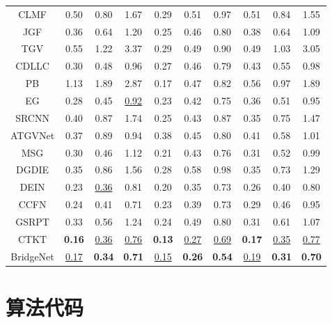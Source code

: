 \documentclass{bjtu-bachelor-thesis}
\begin{document}
{\begin{longtable}{c|ccc|ccc|ccc}
CLMF      & 0.50 & 0.80       & 1.67          & 0.29 & 0.51 & 0.97 & 0.51 & 0.84 & 1.55          \\ 
JGF     & 0.36 & 0.64       & 1.20          & 0.25 & 0.46 & 0.80 & 0.38 & 0.64 & 1.09          \\ 
TGV       & 0.55 & 1.22       & 3.37          & 0.29 & 0.49 & 0.90 & 0.49 & 1.03 & 3.05          \\ 
CDLLC    & 0.30 & 0.48       & 0.96          & 0.27 & 0.46 & 0.79 & 0.43 & 0.55 & 0.98          \\ 
PB       & 1.13 & 1.89       & 2.87          & 0.17 & 0.47 & 0.82 & 0.56 & 0.97 & 1.89          \\ \bottomrule[1.5pt]
EG       & 0.28 & 0.45       & \uline{0.92}    & 0.23 & 0.42 & 0.75 & 0.36 & 0.51 & 0.95          \\ 
\hline
SRCNN   & 0.40 & 0.87       & 1.74          & 0.25 & 0.43 & 0.87 & 0.35 & 0.75 & 1.47          \\
ATGVNet  & 0.37 & 0.89       & 0.94          & 0.38 & 0.45 & 0.80 & 0.41 & 0.58 & 1.01 \\
MSG    & 0.30 & 0.46       & 1.12          & 0.21 & 0.43 & 0.76 & 0.31 & 0.52 & 0.99          \\
DGDIE    & 0.35 & 0.86       & 1.56          & 0.28 & 0.58 & 0.98 & 0.35 & 0.73 & 1.29          \\
DEIN       & 0.23 & \uline{0.36} & 0.81 & 0.20 & 0.35 & 0.73 & 0.26 & 0.40 & 0.80          \\
CCFN   & 0.24 & 0.41       & 0.71          & 0.23 & 0.39 & 0.73 & 0.29 & 0.46 & 0.95          \\
GSRPT   & 0.33 & 0.56       & 1.24          & 0.24 & 0.49 & 0.80 & 0.31 & 0.61 & 1.07          \\
CTKT     & \textbf{0.16} & \uline{0.36}    & \uline{0.76}    & \textbf{0.13} & \uline{0.27}    & \uline{0.69}    & \textbf{0.17} & \uline{0.35}    & \uline{0.77}          \\
BridgeNet         & \uline{0.17}    & \textbf{0.34} & \textbf{0.71} & \uline{0.15}    & \textbf{0.26} & \textbf{0.54} & \uline{0.19}    & \textbf{0.31} &  \textbf{0.70}\\
\bottomrule[1.5pt]
\end{longtable}}


\chapter{算法代码}
\end{document}
